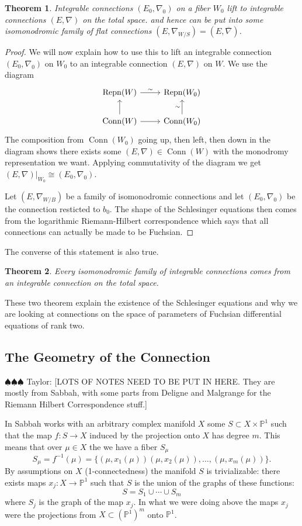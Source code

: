 \documentclass[12pt]{book}
\newcommand{\taylor}[1]{{\color{blue} \sf $\spadesuit\spadesuit\spadesuit$ Taylor: [#1]}}
\numberwithin{equation}{section}
\newtheorem{theorem}{Theorem}[subsection]
\theoremstyle{definition}
\theoremstyle{remark}
\newcommand{\PP}{\mathbb{P}}
\newcommand{\Conn}{\operatorname{Conn}}
\newcommand{\Repn}{\operatorname{Repn}}
\begin{document}
\begin{theorem}
	Integrable connections $(E_0,\nabla_0)$ on a fiber $W_0$ lift to integrable connections $(E,\nabla)$ on the total space.
	and hence can be put into some isomonodromic family of flat connections $(E,\nabla_{W/S}) = (E,\overline{\nabla})$. 
\end{theorem}
\begin{proof}
	We will now explain how to use this to lift an integrable connection $(E_0,\nabla_0)$ on $W_0$ to an integrable connection $(E,\nabla)$ on $W$. 
	We use the diagram 
	$$\begin{tikzcd}
	\Repn(W) \ar[r, "\sim"] & \Repn(W_0) \\
	\Conn(W) \ar[r]\ar[u] & \Conn(W_0) \ar[u,"\sim"]
	\end{tikzcd}
	$$ 
	The composition from $\Conn(W_0)$ going up, then left, then down in the diagram shows there exists some $(E,\nabla) \in \Conn(W)$ with the monodromy representation we want.
	Applying commutativity of the diagram we get $(E,\nabla)\vert_{W_0} \cong (E_0,\nabla_0)$. 
	
	Let $(E,\nabla_{W/B})$ be a family of isomonodromic connections and let $(E_0,\nabla_0)$ be the connection resticted to $b_0$. 
	The shape of the Schlesinger equations then comes from the logarithmic Riemann-Hilbert correspondence which says that all connections can actually be made to be Fuchsian.
\end{proof}


The converse of this statement is also true. 
\begin{theorem}
	Every isomonodromic family of integrable connections comes from an integrable connection on the total space. 
\end{theorem}

These two theorem explain the existence of the Schlesinger equations and why we are looking at connections on the space of parameters of Fuchsian differential equations of rank two.


\iffalse 

\subsection{The Geometry of the Connection}

\taylor{LOTS OF NOTES NEED TO BE PUT IN HERE. They are mostly from Sabbah, with some parts from Deligne and Malgrange for the Riemann Hilbert Correspondence stuff.}

In \cite[VI, \S1, pg 192]{Sabbah2007} Sabbah works with an arbitrary complex manifold $X$ some $S \subset X\times \PP^1$ such that the map $f:S \to X$ induced by the projection onto $X$ has degree $m$. 
This means that over $\mu \in X$ the we have a fiber $S_{\mu}$
$$S_{\mu} = f^{-1}(\mu) = \lbrace (\mu,x_1(\mu)) (\mu,x_2(\mu)),\ldots,(\mu,x_m(\mu))\rbrace.$$ 
By assumptions on $X$ (1-connectedness) the manifold $S$ is trivializable: there exists maps $x_j: X \to \PP^1$ such that $S$ is the union of the graphs of these functions:
 $$ S=S_1 \cup \cdots \cup S_m $$
where $S_j$ is the graph of the map $x_j$.
In what we were doing above the maps $x_j$ were the projections from $X\subset (\PP^1)^m$ onto $\PP^1$.
\end{document}
